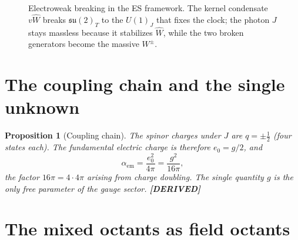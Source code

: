 \documentclass[11pt,oneside]{book}
\newcommand{\Wh}{\hat{W}}                         %
\newcommand{\su}{\mathfrak{su}}
\newcommand{\status}[1]{{\sffamily\bfseries\color{statuscol}[#1]}}
\theoremstyle{plain}
\newtheorem{proposition}[theorem]{Proposition}
\theoremstyle{definition}
\theoremstyle{remark}
\begin{document}
\begin{figure}[t]
\centering
{}
\caption{Electroweak breaking in the ES framework. The kernel condensate $v\Wh$
breaks $\su(2)_T$ to the $U(1)_J$ that fixes the clock; the photon $J$ stays
massless because it stabilizes $\Wh$, while the two broken generators become the
massive $W^\pm$.}
\label{fig:ew}
\end{figure}

\section{The coupling chain and the single unknown}
\label{sec:coupling}

\begin{proposition}[Coupling chain]
\label{prop:coupling}
The spinor charges under $J$ are $q=\pm\tfrac12$ (four states each). The
fundamental electric charge is therefore $e_0=g/2$, and
\[
  \alpha_{\mathrm{em}}=\frac{e_0^2}{4\pi}=\frac{g^2}{16\pi},
\]
the factor $16\pi=4\cdot4\pi$ arising from charge doubling. The single quantity
$g$ is the only free parameter of the gauge sector. \status{DERIVED}
\end{proposition}

\section{The mixed octants as field octants}
\label{sec:field-octants}
\end{document}
